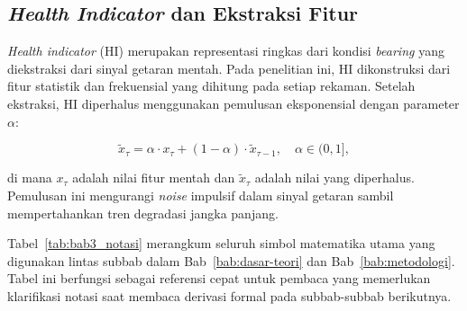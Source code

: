 \subsection{\emph{Health Indicator} dan Ekstraksi Fitur}
\label{subsec:bab3_health_indicator}

\emph{Health indicator} (HI) merupakan representasi ringkas dari kondisi \emph{bearing}
yang diekstraksi dari sinyal getaran mentah. Pada penelitian ini, HI dikonstruksi
dari fitur statistik dan frekuensial yang dihitung pada setiap rekaman. Setelah
ekstraksi, HI diperhalus menggunakan pemulusan eksponensial dengan parameter
$\alpha$:

\begin{equation}\label{eq:bab3_ema}
  \tilde{x}_\tau = \alpha \cdot x_\tau + (1 - \alpha) \cdot \tilde{x}_{\tau-1},
  \quad \alpha \in (0, 1],
\end{equation}

\noindent di mana $x_\tau$ adalah nilai fitur mentah dan $\tilde{x}_\tau$ adalah
nilai yang diperhalus. Pemulusan ini mengurangi \emph{noise} impulsif dalam
sinyal getaran sambil mempertahankan tren degradasi jangka panjang.

Tabel~\ref{tab:bab3_notasi} merangkum seluruh simbol matematika utama yang
digunakan lintas subbab dalam Bab~\ref{bab:dasar-teori} dan
Bab~\ref{bab:metodologi}. Tabel ini berfungsi sebagai referensi cepat untuk
pembaca yang memerlukan klarifikasi notasi saat membaca derivasi formal pada
subbab-subbab berikutnya.

